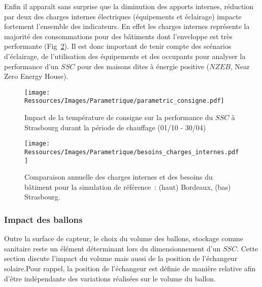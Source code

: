 Enfin il apparaît sans surprise que la diminution des apports internes, réduction par deux
des charges internes électriques (équipements et éclairage) impacte fortement l’ensemble
des indicateurs. En effet les charges internes représente la majorité des consommations
pour des bâtiments dont l’enveloppe est très performante
(Fig~\ref{fig:besoins_charges_internes}). Il est donc important de tenir compte des
scénarios d’éclairage, de l’utilisation des équipements et des occupants pour analyser la
performance d’un $SSC$ pour des maisons dites à énergie positive ($NZEB$, Near Zero Energy
House).

\begin{figure}
    \begin{center}
        \texttt{[image: Ressources/Images/Parametrique/parametric\_consigne.pdf]}
    \end{center}
    \caption{Impact de la température de consigne sur la performance
             du $SSC$ à Strasbourg durant la période de chauffage (01/10 - 30/04)
             \label{fig:impact_temp_consigne}}
\end{figure}

\begin{figure}
    \begin{center}
        \texttt{[image: Ressources/Images/Parametrique/besoins\_charges\_internes.pdf]}
    \end{center}
    \caption{Comparaison annuelle des charges internes et des besoins du bâtiment
             pour la simulation de référence~: (haut) Bordeaux, (bas) Strasbourg.
             \label{fig:besoins_charges_internes}}
\end{figure}


\subsubsection{Impact des ballons} %
\label{ssub:impact_des_ballons}
Outre la surface de capteur, le choix du volume des ballons, stockage comme sanitaire
reste un élément déterminant lors du dimensionnement d’un $SSC$. Cette section discute
l’impact du volume mais aussi de la position de l’échangeur solaire.Pour rappel, la
position de l’échangeur est définie de manière relative afin d’être indépendante des
variations réalisées sur le volume du ballon.

